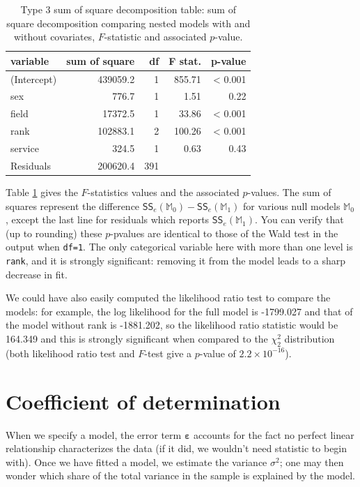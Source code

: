 \documentclass[
  11pt,
  letterpaper,
]{book}
\theoremstyle{definition}
\theoremstyle{definition}
\theoremstyle{definition}
\theoremstyle{definition}
\theoremstyle{remark}
\begin{document}
\begin{table}

\caption{\label{tab:summaryanovalmcollege}Type 3 sum of square decomposition table: sum of square decomposition comparing nested models with and without covariates, $F$-statistic and associated $p$-value.}
\centering
\begin{tabular}[t]{lrrrr}
\toprule
variable & sum of square & df & F stat. & p-value\\
\midrule
(Intercept) & 439059.2 & 1 & 855.71 & < 0.001\\
sex & 776.7 & 1 & 1.51 & 0.22\\
field & 17372.5 & 1 & 33.86 & < 0.001\\
rank & 102883.1 & 2 & 100.26 & < 0.001\\
service & 324.5 & 1 & 0.63 & 0.43\\
\addlinespace
Residuals & 200620.4 & 391 &  & \\
\bottomrule
\end{tabular}
\end{table}

Table \ref{tab:summaryanovalmcollege} gives the \(F\)-statistics values and the associated \(p\)-values. The sum of squares represent the difference \(\mathsf{SS}_e(\mathbb{M}_0)-\mathsf{SS}_e(\mathbb{M}_1)\) for various null models \(\mathbb{M}_0\), except the last line for residuals which reports \(\mathsf{SS}_e(\mathbb{M}_1)\). You can verify that (up to rounding) these \(p\)-pvalues are identical to those of the Wald test in the output when \texttt{df=1}. The only categorical variable here with more than one level is \texttt{rank}, and it is strongly significant: removing it from the model leads to a sharp decrease in fit.

We could have also easily computed the likelihood ratio test to compare the models: for example, the log likelihood for the full model is -1799.027 and that of the model without rank is -1881.202, so the likelihood ratio statistic would be 164.349 and this is strongly significant when compared to the \(\chi^2_2\) distribution (both likelihood ratio test and \(F\)-test give a \(p\)-value of \(2.2 \times 10^{-16}\)).

\hypertarget{coefR2}{%
\section{Coefficient of determination}\label{coefR2}}

When we specify a model, the error term \(\boldsymbol{\varepsilon}\) accounts for the fact no perfect linear relationship characterizes the data (if it did, we wouldn't need statistic to begin with). Once we have fitted a model, we estimate the variance \(\sigma^2\); one may then wonder which share of the total variance in the sample is explained by the model.
\end{document}
